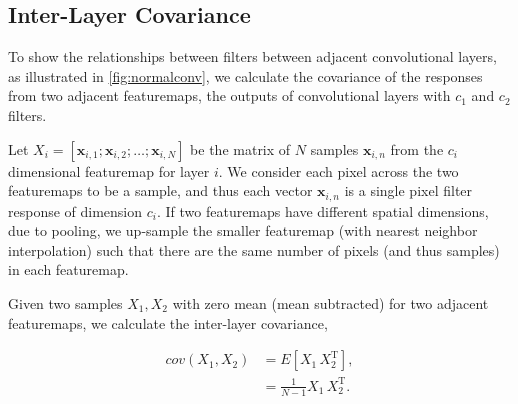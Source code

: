 \documentclass[thesis]{subfiles}
\begin{document}
	\subsection{Inter-Layer Covariance}
	\label{interlayercovar}
	To show the relationships between filters between adjacent convolutional layers, as illustrated in \cref{fig:normalconv}, we calculate the covariance of the responses from two adjacent featuremaps, the outputs of convolutional layers with $c_1$ and $c_2$ filters.
	
	Let $X_i = [\mathbf{x}_{i,1}; \mathbf{x}_{i,2}; \ldots ; \mathbf{x}_{i,N}]$ be the matrix of $N$ samples $\mathbf{x}_{i,n}$ from the $c_i$ dimensional featuremap for layer $i$. We consider each pixel across the two featuremaps to be a sample, and thus each vector $\mathbf{x}_{i,n}$ is a single pixel filter response of dimension $c_i$. If two featuremaps have different spatial dimensions, due to pooling, we up-sample the smaller featuremap (with nearest neighbor interpolation) such that there are the same number of pixels (and thus samples) in each featuremap.
	
	Given two samples $X_1, X_2$ with zero mean (\ie mean subtracted) for two adjacent featuremaps, we calculate the inter-layer covariance,
	
	\begin{align}
	cov(X_1, X_2) &= E\left[X_1\,X_2^\textrm{T}\right],\\
	&= \frac{1}{N-1} X_1\,X_2^\textrm{T}.
	\end{align}
	
\end{document}
